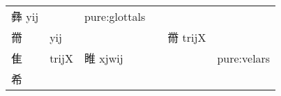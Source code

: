 \documentclass[14pt,a4paper]{scrartcl}
\begin{document}
\begin{longtable}[c]{@{}llllll@{}}
\begin{minipage}[t]{0.14\columnwidth}
彝 yij
\strut\end{minipage} &
\begin{minipage}[t]{0.14\columnwidth}\raggedright\strut
\strut\end{minipage} &
\begin{minipage}[t]{0.14\columnwidth}\raggedright\strut
pure:glottals
\strut\end{minipage}\tabularnewline
\begin{minipage}[t]{0.14\columnwidth}\raggedright\strut
黹
\strut\end{minipage} &
\begin{minipage}[t]{0.14\columnwidth}\raggedright\strut
yij
\strut\end{minipage} &
\begin{minipage}[t]{0.14\columnwidth}\raggedright\strut
\strut\end{minipage} &
\begin{minipage}[t]{0.14\columnwidth}\raggedright\strut
\strut\end{minipage} &
\begin{minipage}[t]{0.14\columnwidth}\raggedright\strut
黹 trijX
\strut\end{minipage} &
\begin{minipage}[t]{0.14\columnwidth}\raggedright\strut
\strut\end{minipage}\tabularnewline
\begin{minipage}[t]{0.14\columnwidth}\raggedright\strut
隹
\strut\end{minipage} &
\begin{minipage}[t]{0.14\columnwidth}\raggedright\strut
trijX
\strut\end{minipage} &
\begin{minipage}[t]{0.14\columnwidth}\raggedright\strut
睢 xjwij
\strut\end{minipage} &
\begin{minipage}[t]{0.14\columnwidth}\raggedright\strut
\strut\end{minipage} &
\begin{minipage}[t]{0.14\columnwidth}\raggedright\strut
\strut\end{minipage} &
\begin{minipage}[t]{0.14\columnwidth}\raggedright\strut
pure:velars
\strut\end{minipage}\tabularnewline
\begin{minipage}[t]{0.14\columnwidth}\raggedright\strut
希
\strut\end{minipage} &
\begin{minipage}[t]{0.14\columnwidth}\raggedright\strut

\end{minipage}
\end{longtable}
\end{document}
